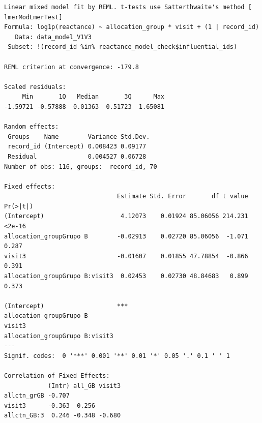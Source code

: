 \documentclass[
  letterpaper,
  DIV=11,
  numbers=noendperiod]{scrartcl}
\newenvironment{Shaded}{\begin{snugshade}}{\end{snugshade}}
\newcommand{\NormalTok}[1]{\textcolor[rgb]{0.00,0.23,0.31}{#1}}
\newcommand{\SpecialCharTok}[1]{\textcolor[rgb]{0.37,0.37,0.37}{#1}}
\begin{document}
\begin{verbatim}
Linear mixed model fit by REML. t-tests use Satterthwaite's method [
lmerModLmerTest]
Formula: log1p(reactance) ~ allocation_group * visit + (1 | record_id)
   Data: data_model_V1V3
 Subset: !(record_id %in% reactance_model_check$influential_ids)

REML criterion at convergence: -179.8

Scaled residuals: 
     Min       1Q   Median       3Q      Max 
-1.59721 -0.57888  0.01363  0.51723  1.65081 

Random effects:
 Groups    Name        Variance Std.Dev.
 record_id (Intercept) 0.008423 0.09177 
 Residual              0.004527 0.06728 
Number of obs: 116, groups:  record_id, 70

Fixed effects:
                               Estimate Std. Error       df t value Pr(>|t|)
(Intercept)                     4.12073    0.01924 85.06056 214.231   <2e-16
allocation_groupGrupo B        -0.02913    0.02720 85.06056  -1.071    0.287
visit3                         -0.01607    0.01855 47.78854  -0.866    0.391
allocation_groupGrupo B:visit3  0.02453    0.02730 48.84683   0.899    0.373
                                  
(Intercept)                    ***
allocation_groupGrupo B           
visit3                            
allocation_groupGrupo B:visit3    
---
Signif. codes:  0 '***' 0.001 '**' 0.01 '*' 0.05 '.' 0.1 ' ' 1

Correlation of Fixed Effects:
            (Intr) all_GB visit3
allctn_grGB -0.707              
visit3      -0.363  0.256       
allctn_GB:3  0.246 -0.348 -0.680
\end{verbatim}

\begin{Shaded}
\end{Shaded}
\end{document}
